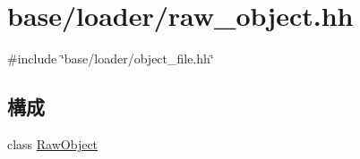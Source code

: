 \hypertarget{raw__object_8hh}{
\section{base/loader/raw\_\-object.hh}
\label{raw__object_8hh}
}
{\ttfamily \#include \char`\"{}base/loader/object\_\-file.hh\char`\"{}}\par
\subsection*{構成}
\begin{DoxyCompactItemize}
\item 
class \hyperlink{classRawObject}{RawObject}
\end{DoxyCompactItemize}
